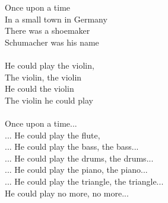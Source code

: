 
Once upon a time \\ In a small town in Germany \\ There was a shoemaker \\ Schumacher was his name \\ \hspace{10mm} \\ He could play the violin, \\ The violin, the violin \\ He could the violin \\ The violin he could play \\ \hspace{10mm} \\ Once upon a time... \\ ... He could play the flute, \\ ... He could play the bass, the bass... \\ ... He could play the drums, the drums... \\ ... He could play the piano, the piano... \\ ... He could play the triangle, the triangle... \\ He could play no more, no more...